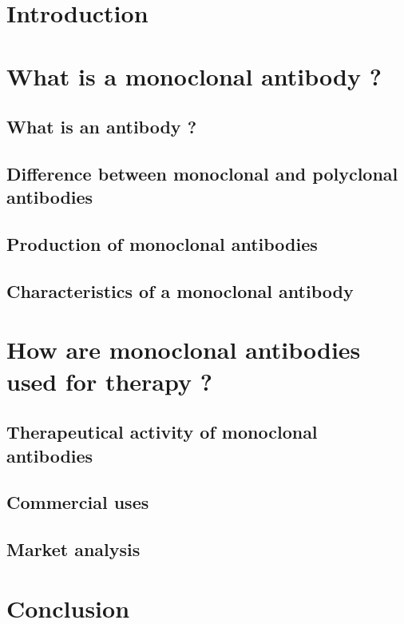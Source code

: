 \documentclass{article}
\author{Louis-Justin Tallot}
\date{February 2022}
\begin{document}
  \maketitle

  \section*{Introduction}

  \section{What is a monoclonal antibody ?}

    \subsection{What is an antibody ?}

    \subsection{Difference between monoclonal and polyclonal antibodies}

    \subsection{Production of monoclonal antibodies}

    \subsection{Characteristics of a monoclonal antibody}

  \section{How are monoclonal antibodies used for therapy ?}

    \subsection{Therapeutical activity of monoclonal antibodies}

    \subsection{Commercial uses}

    \subsection{Market analysis}
    
  
  \section*{Conclusion}
  \printbibliography
\end{document}
